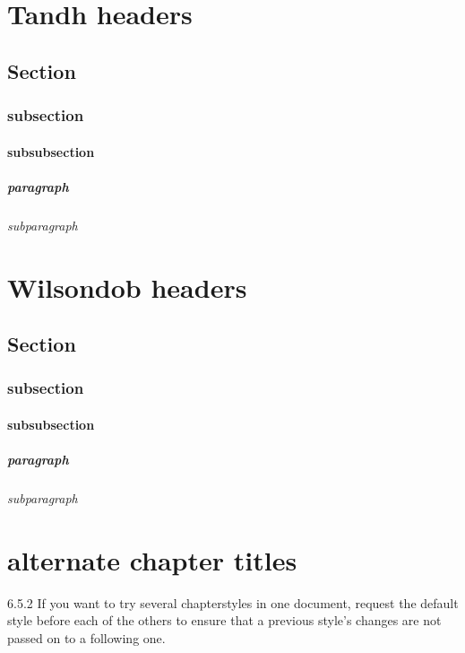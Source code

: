 \documentclass[a4paper, 12pt]{memoir}
\begin{document}
\chapter*{ Tandh headers } 
\section*{ Section }
\subsection*{subsection }
\subsubsection*{subsubsection} 
\paragraph*{paragraph} 
\subparagraph*{subparagraph} 

\chapter*{ Wilsondob headers } 
\section*{ Section }
\subsection*{subsection }
\subsubsection*{subsubsection} 
\paragraph*{paragraph} 
\subparagraph*{subparagraph} 





\chapter*{ alternate chapter titles }
 
6.5.2
If you want to try several chapterstyles in one document, request the default style
before each of the others to ensure that a previous style’s changes are not passed on to a
following one.
\end{document}
